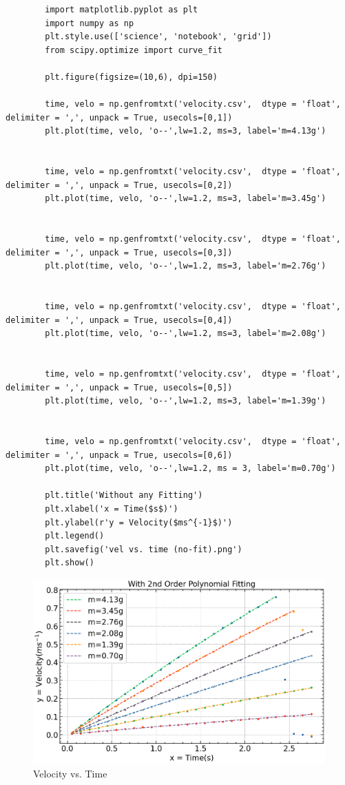 \documentclass{article}
\begin{document}
 	\begin{lstlisting}
 		import matplotlib.pyplot as plt
 		import numpy as np
 		plt.style.use(['science', 'notebook', 'grid'])
 		from scipy.optimize import curve_fit
 		
 		plt.figure(figsize=(10,6), dpi=150)
 		
 		time, velo = np.genfromtxt('velocity.csv',  dtype = 'float', delimiter = ',', unpack = True, usecols=[0,1])
 		plt.plot(time, velo, 'o--',lw=1.2, ms=3, label='m=4.13g')
 		
 		
 		time, velo = np.genfromtxt('velocity.csv',  dtype = 'float', delimiter = ',', unpack = True, usecols=[0,2])
 		plt.plot(time, velo, 'o--',lw=1.2, ms=3, label='m=3.45g')
 		
 		
 		time, velo = np.genfromtxt('velocity.csv',  dtype = 'float', delimiter = ',', unpack = True, usecols=[0,3])
 		plt.plot(time, velo, 'o--',lw=1.2, ms=3, label='m=2.76g')
 		
 		
 		time, velo = np.genfromtxt('velocity.csv',  dtype = 'float', delimiter = ',', unpack = True, usecols=[0,4])
 		plt.plot(time, velo, 'o--',lw=1.2, ms=3, label='m=2.08g')
 		
 		
 		time, velo = np.genfromtxt('velocity.csv',  dtype = 'float', delimiter = ',', unpack = True, usecols=[0,5])
 		plt.plot(time, velo, 'o--',lw=1.2, ms=3, label='m=1.39g')
 		
 		
 		time, velo = np.genfromtxt('velocity.csv',  dtype = 'float', delimiter = ',', unpack = True, usecols=[0,6])
 		plt.plot(time, velo, 'o--',lw=1.2, ms = 3, label='m=0.70g')
 		
 		plt.title('Without any Fitting')
 		plt.xlabel('x = Time($s$)')
 		plt.ylabel(r'y = Velocity($ms^{-1}$)')
 		plt.legend()
 		plt.savefig('vel vs. time (no-fit).png')
 		plt.show()
 	\end{lstlisting}
 
 	\begin{figure}[H]
 		\centering
 		\includegraphics[scale=0.7]{vel vs. time (with fit).png}
 		\caption{Velocity vs. Time}
 		\label{figure:veltimef}%
 	\end{figure}
 
\end{document}
